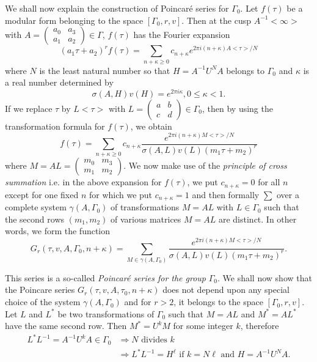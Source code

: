 We \pageoriginale shall now explain the construction of Poincar\'e
series for $\Gamma_0$. Let $f(\tau)$ be a modular form belonging 
to the space $[\Gamma_0,r,v]$. Then at the cusp $A^{-1}<\infty>$ with
$A=\left(\begin{smallmatrix} a_0 &
  a_3\\a_1&a_2 \end{smallmatrix}\right)\in \Gamma$, $f(\tau)$
has the Fourier expansion
$$
(a_1\tau+a_2)^r f(\tau) = \sum_{n+\kappa\geq 0} c_{n+\kappa} e^{2\pi i
(n+\kappa)A<\tau>/N} 
$$
where $N$ is the least natural number so that $H=A^{-1}U^NA$ belongs
to $\Gamma_0$ and $\kappa$ is a real number determined by
$$
\sigma(A,H)v(H) = e^{2\pi i \kappa}, 0 \leq \kappa < 1.
$$
If we replace $\tau$ by $L<\tau>$ with
$L=\left(\begin{smallmatrix}
a&b\\c&d \end{smallmatrix}\right)\in \Gamma_0$, then by
using the transformation formula for $f(\tau)$, we obtain 
$$
f(\tau) = \sum_{n+\kappa \geq 0} c_{n+\kappa} \frac{e^{2\pi i
    (n+\kappa)M<\tau>/N}}{\sigma(A,L)v(L)(m_1\tau+m_2)^r} 
$$
where $M=AL=\left(\begin{smallmatrix} m_0&m_3\\m_1
  &m_2 \end{smallmatrix}\right)$. We now make use of the
\textit{principle of cross summation} i.e. in the above expansion for
$f(\tau)$, we put $c_{n+\kappa}=0$ for all $n$ except for one fixed
$n$ for which we put $c_{n+\kappa}=1$ and then formally $\sum$ over a
complete system $\gamma(A,\Gamma_0)$ of transformations $M=AL$ with
$L\in \Gamma_0$ such that the second rows $(m_1, m_2)$ of
various matrices $M=AL$ are distinct. In other words, we form the
function 
\begin{equation*}
G_r(\tau, v, A, \Gamma_0, n+\kappa) = \sum_{M\in
  \gamma(A,\Gamma_0)} \frac{e^{2\pi
    i(n+\kappa)M<\tau>/N}}{\sigma(A,L)v(L)
(m_1\tau+m_2)^r}. \tag{1}\label{c3:eq2:1}
\end{equation*}

This series is a so-called \textit{Poincar\'e series for the group}
$\Gamma_0$. We shall now \pageoriginale show that the Poincare series
$G_r(\tau, v, A, \tau_0, n+\kappa)$ does not depend upon any special
choice of the system $\gamma(A,\Gamma_0)$ and for $r>2$, it belongs
to the space $[\Gamma_0, r,v]$. Let $L$ and $L^{\ast}$ be two
transformations of $\Gamma_0$ such that $M=AL$ and
$M^{\ast}=AL^{\ast}$ have the same second row. Then $M^{\ast}=U^kM$
for some integer $k$, therefore 
\begin{align*}
L^{\ast} L^{-1} = A^{-1} U^k A \in \Gamma_0 & \Longrightarrow
N \text{ divides } k\\
& \Longrightarrow L^{\ast} L^{-1} = H^{\ell} \text{ if } k = N\ell
\text{ and } H=A^{-1} U^N A.
\end{align*}

